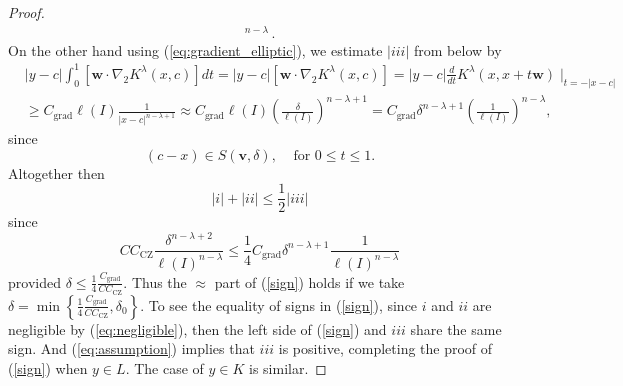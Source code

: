 \documentclass{amsart}%
\theoremstyle{plain}
\numberwithin{equation}{section}
\begin{document}
\begin{proof}
\begin{align*}
{^{n-\lambda}}\,.
\end{align*}
On the other hand using (\ref{eq:gradient_elliptic}), we estimate
$\left\vert iii\right\vert $ from below by%
\begin{align*}
&  \left\vert y-c\right\vert \int_{0}^{1}\left[  \mathbf{w}\cdot\nabla
_{2}K^{\lambda}\left(  x,c\right)  \right]  dt=\left\vert y-c\right\vert
\left[  \mathbf{w}\cdot\nabla_{2}K^{\lambda}\left(  x,c\right)  \right] =\left\vert y-c\right\vert \frac{d}{dt}K^{\lambda}\left(  x,x+t\mathbf{w}%
	\right)  \mid_{t=-\left\vert x-c\right\vert } \\ &\geq C_{\operatorname{grad}}%
\ell\left(  I\right)  \frac{1}{\left\vert x-c\right\vert ^{n-\lambda+1}}  \approx C_{\operatorname{grad}}\ell\left(  I\right)  \left(  \frac{\delta
}{\ell\left(  I\right)  }\right)  ^{n-\lambda+1}=C_{\operatorname{grad}}%
\delta^{n-\lambda+1}\left(  \frac{1}{\ell\left(  I\right)  }\right)
^{n-\lambda},
\end{align*}
since
\[
\left(  c-x\right)  \in S\left(  \mathbf{v},\delta\right)
,\ \ \ \ \ \text{for }0\leq t\leq1.
\]
Altogether then%
\begin{equation}
\left\vert i\right\vert +\left\vert ii\right\vert \leq\frac{1}{2}\left\vert
iii\right\vert \label{eq:negligible}%
\end{equation}
since%
\[
CC_{\operatorname*{CZ}}\frac{\delta^{n-\lambda+2}}{\ell\left(  I\right)
^{n-\lambda}}\leq\frac{1}{4}C_{\operatorname{grad}}\delta^{n-\lambda+1}%
\frac{1}{\ell\left(  I\right)  ^{n-\lambda}}%
\]
provided $\delta\leq\frac{1}{4}\frac{C_{\operatorname{grad}}}%
{CC_{\operatorname*{CZ}}}$. Thus the $\approx$ part of (\ref{sign}) holds if
we take $\delta=\min\left\{  \frac{1}{4}\frac{C_{\operatorname{grad}}%
}{CC_{\operatorname*{CZ}}},\delta_{0}\right\}  $. To see the equality of signs in (\ref{sign}), since $i$ and $ii$ are negligible by (\ref{eq:negligible}), then the
left side of (\ref{sign}) and $iii$ share the same sign. And (\ref{eq:assumption}) implies that $iii$ is positive, completing the proof of (\ref{sign}) when $y\in L$. The case of $y\in K$ is similar.


\end{proof}
\end{document}
